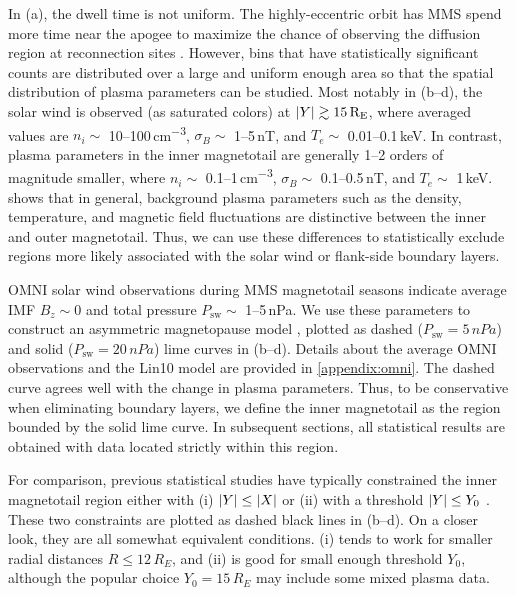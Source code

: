 \documentclass[draft]{agujournal2019}
\begin{document}
In (a), the dwell time is not uniform. The highly-eccentric orbit has MMS spend more time near the apogee to maximize the chance of observing the diffusion region at reconnection sites \cite{Fuselier2016}. However, bins that have statistically significant counts are distributed over a large and uniform enough area so that the spatial distribution of plasma parameters can be studied. Most notably in (b--d), the solar wind is observed (as saturated colors) at ${\abs{Y}\gtrsim15\,\si{R_E}}$, where averaged values are ${n_i\sim}$ 10--100\,\si{cm\tothe{-3}}, ${\sigma_B\sim}$ 1--5\,\si{nT}, and ${T_e\sim}$ 0.01--0.1\,\si{keV}. In contrast, plasma parameters in the inner magnetotail are generally 1--2 orders of magnitude smaller, where ${n_i\sim}$ 0.1--1\,\si{cm\tothe{-3}}, ${\sigma_B\sim}$ 0.1--0.5\,\si{nT}, and ${T_e\sim}$ 1\,\si{keV}.  shows that in general, background plasma parameters such as the density, temperature, and magnetic field fluctuations are distinctive between the inner and outer magnetotail. Thus, we can use these differences to statistically exclude regions more likely associated with the solar wind or flank-side boundary layers.

OMNI solar wind observations during MMS magnetotail seasons indicate average IMF ${B_z\sim0}$ and total pressure ${P_\text{sw}\sim}$ 1--5\,\si{nPa}. We use these parameters to construct an asymmetric magnetopause model \cite{Lin2010}, plotted as dashed (${P_\text{sw}=5\,\si{nPa}}$) and solid (${P_\text{sw}=20\,\si{nPa}}$) lime curves in (b--d). Details about the average OMNI observations and the Lin10 model are provided in \ref{appendix:omni}. The dashed curve agrees well with the change in plasma parameters. Thus, to be conservative when eliminating boundary layers, we define the inner magnetotail as the region bounded by the solid lime curve. In subsequent sections, all statistical results are obtained with data located strictly within this region.

For comparison, previous statistical studies have typically constrained the inner magnetotail region either with (i) ${\abs{Y}\leq\abs{X}}$ \cite{Ergun2015} or (ii) with a threshold ${\abs{Y}\leq Y_0}$ \cite{Boakes2014,Chong2022}. These two constraints are plotted as dashed black lines in (b--d). On a closer look, they are all somewhat equivalent conditions. (i) tends to work for smaller radial distances ${R\leq12\,\si{R_E}}$, and (ii) is good for small enough threshold $Y_0$, although the popular choice ${Y_0=15\,\si{R_E}}$ may include some mixed plasma data. 
\end{document}
